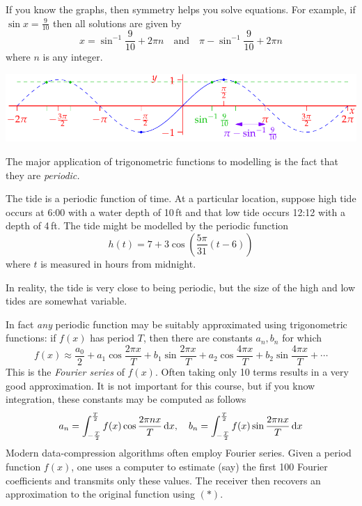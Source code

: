 \begin{example}{}{}
	If you know the graphs, then symmetry helps you solve equations. For example, if $\sin x=\frac 9{10}$ then all solutions are given by
	\[
		x=\sin^{-1}\frac 9{10}+2\pi n\quad\text{and}\quad \pi-\sin^{-1}\frac 9{10}+2\pi n
	\]
	where $n$ is any integer.
	\begin{center}
		\includegraphics{invsine3}
	\end{center}
\end{example}



The major application of trigonometric functions to modelling is the fact that they are \emph{periodic.}

\begin{example}{}{}
	The tide is a periodic function of time. At a particular location, suppose high tide occurs at 6:00 with a water depth of 10\,ft and that low tide occurs 12:12 with a depth of 4\,ft. The tide might be modelled by the periodic function
	\[
		h(t)=7+3\cos\left(\frac{5\pi}{31}(t-6)\right)
	\] 
	where $t$ is measured in hours from midnight. 
\end{example}

In reality, the tide is very close to being periodic, but the size of the high and low tides are somewhat variable.\bigbreak

In fact \emph{any} periodic function may be suitably approximated using trigonometric functions: if $f(x)$ has period $T$, then there are constants $a_n,b_n$ for which
\[
	f(x)\approx \frac{a_0}2+a_1\cos\frac{2\pi x}T +b_1\sin\frac{2\pi x}T +a_2\cos\frac{4\pi x}T +b_2\sin\frac{4\pi x}T +\cdots \tag{$\ast$}
\]
This is the \emph{Fourier series} of $f(x)$. Often taking only 10 terms results in a very good approximation. It is not important for this course, but if you know integration, these constants may be computed as follows
\[
	a_n=\int_{-\frac T2}^{\frac T2} f(x)\cos\frac{2\pi nx}T\,{\mathrm{d} x},\quad b_n=\int_{-\frac T2}^{\frac T2} f(x)\sin\frac{2\pi nx}T\,{\mathrm{d} x}
\]
Modern data-compression algorithms often employ Fourier series. Given a period function $f(x)$, one uses a computer to estimate (say) the first 100 Fourier coefficients and transmits only these values. The receiver then recovers an approximation to the original function using $(\ast)$.

